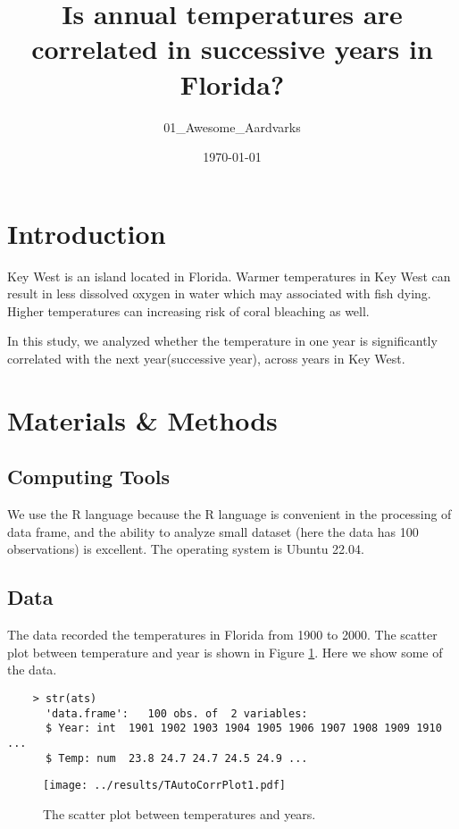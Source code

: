 \documentclass[12pt]{article}
\title{Is annual temperatures are correlated in successive years in Florida?}
\author{01\_Awesome\_Aardvarks}
\date{\today}
\begin{document}
  \maketitle
  \section{Introduction}
  Key West is an island located in Florida. Warmer temperatures in Key West can result in less dissolved oxygen in water which may associated with fish dying. Higher temperatures can increasing risk of coral bleaching as well\citep{climatechange}. \par
  \vspace{5mm}
  \noindent In this study, we analyzed whether the temperature in one year is significantly correlated with the next year(successive year), across years in Key West.
  \section{Materials \& Methods}
  \subsection{Computing Tools}
  We use the R language because the R language is convenient in the processing of data frame, and the ability to analyze small dataset (here the data has 100 observations) is excellent. The operating system is Ubuntu 22.04.
  \subsection{Data}
  The data recorded the temperatures in Florida from 1900 to 2000. The scatter plot between temperature and year is shown in Figure \ref{fig:1}. Here we show some of the data.
  \begin{verbatim}
    > str(ats)
      'data.frame':   100 obs. of  2 variables:
      $ Year: int  1901 1902 1903 1904 1905 1906 1907 1908 1909 1910 ...
      $ Temp: num  23.8 24.7 24.7 24.5 24.9 ...
  \end{verbatim}

  \begin{figure}[htb]
    \texttt{[image: ../results/TAutoCorrPlot1.pdf]}
    \caption{The scatter plot between temperatures and years.}
    \label{fig:1}
  \end{figure}
\end{document}
